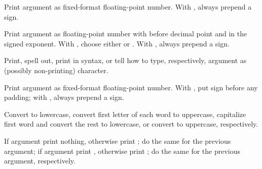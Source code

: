 \begin{LIST}{1cm}
\begin{LIST}{.5cm}
    {
    Print argument as fixed-format floating-point number. With
    , always prepend a sign. 
  }

    {
      Print argument as floating-point number with 
      before decimal point and  in the signed
      exponent. With , choose either  or
      . With , always prepend a sign. 
  }

    {
    Print, spell out, print in \kwd{\#$\backslash$} syntax, or tell how to type, respectively, argument as
    (possibly non-printing) character.
  }

  {
  Print argument as fixed-format floating-point number. With \KWD{:},
  put sign before any padding; with , always prepend a sign.}

    {
    Convert to lowercase, convert first letter of each word to
    uppercase, capitalize first word and convert
    the rest to lowercase, or convert to uppercase, respectively.
  }

    {
    If argument   print nothing, otherwise print ;
    do the same for the previous argument; if argument  
    print , otherwise print ; do the same for the
    previous argument, respectively.  
  }


\end{LIST}
\end{LIST}
